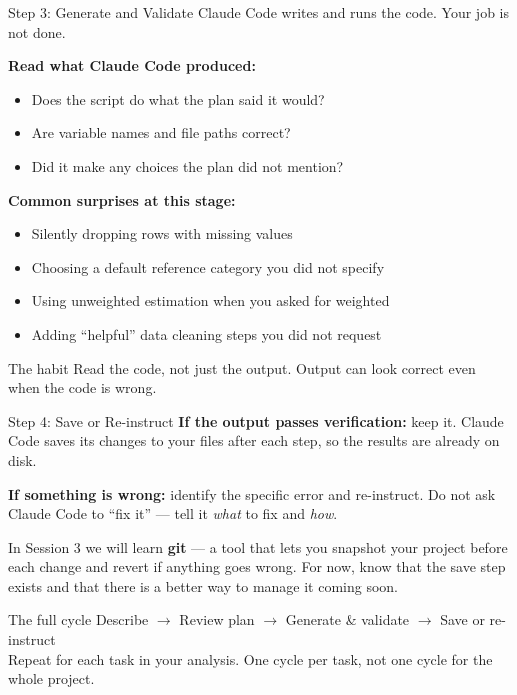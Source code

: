 \documentclass[aspectratio=169, 11pt]{beamer}
\begin{document}
\begin{frame}[fragile]{Step 3: Generate and Validate}
  Claude Code writes and runs the code. Your job is not done.

  \vspace{0.5em}
  \textbf{Read what Claude Code produced:}
  \begin{itemize}
    \item Does the script do what the plan said it would?
    \item Are variable names and file paths correct?
    \item Did it make any choices the plan did not mention?
  \end{itemize}

  \vspace{0.5em}
  \textbf{Common surprises at this stage:}
  \begin{itemize}
    \item Silently dropping rows with missing values
    \item Choosing a default reference category you did not specify
    \item Using unweighted estimation when you asked for weighted
    \item Adding ``helpful'' data cleaning steps you did not request
  \end{itemize}

  \vspace{0.5em}
  \begin{block}{The habit}
    Read the code, not just the output. Output can look correct even when the code is wrong.
  \end{block}
\end{frame}

\begin{frame}{Step 4: Save or Re-instruct}
  \textbf{If the output passes verification:} keep it. Claude Code saves its changes to your files after each step, so the results are already on disk.

  \vspace{0.5em}
  \textbf{If something is wrong:} identify the specific error and re-instruct. Do not ask Claude Code to ``fix it'' --- tell it \textit{what} to fix and \textit{how}.

  \vspace{0.5em}
  In Session 3 we will learn \textbf{git} --- a tool that lets you snapshot your project before each change and revert if anything goes wrong. For now, know that the save step exists and that there is a better way to manage it coming soon.

  \vspace{0.5em}
  \begin{block}{The full cycle}
    Describe $\rightarrow$ Review plan $\rightarrow$ Generate \& validate $\rightarrow$ Save or re-instruct\\[0.3em]
    Repeat for each task in your analysis. One cycle per task, not one cycle for the whole project.
  \end{block}
\end{frame}
\end{document}

